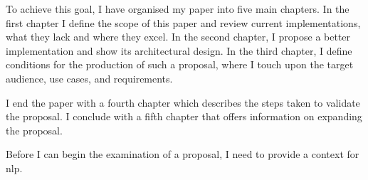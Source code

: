 To achieve this goal, I have organised my paper into five main chapters. In
the first chapter I define the scope of this paper and review current
implementations, what they lack and where they excel. In the second
chapter, I propose a better implementation and show its architectural
design. In the third chapter, I define conditions for the production of
such a proposal, where I touch upon the target audience, use cases, and
requirements.

I end the paper with a fourth chapter which describes the steps taken to
validate the proposal. I conclude with a fifth chapter that offers
information on expanding the proposal.

Before I can begin the examination of a proposal, I need to provide a
context for \gls{nlp}.

\endgroup
